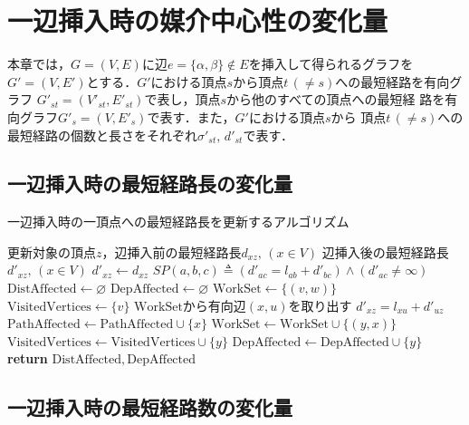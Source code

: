 \chapter{一辺挿入時の媒介中心性の変化量}
\label{chap:update-bc-on-insert}
本章では，$G=(V,E)$に辺$e=\{\alpha,\beta\} \not\in E$を挿入して得られるグラフを
$G'=(V,E')$とする．$G'$における頂点$s$から頂点$t\,(\neq s)$への最短経路を有向グラフ
$G'_{st}=(V'_{st},E'_{st})$で表し，頂点$s$から他のすべての頂点への最短経
路を有向グラフ$G'_s=(V,E'_s)$で表す．また，$G'$における頂点$s$から
頂点$t\,(\neq s)$への最短経路の個数と長さをそれぞれ$\sigma'_{st}$, 
$d'_{st}$で表す．

\section{一辺挿入時の最短経路長の変化量}
\label{sect:update-dist-on-insert}

\begin{algorithm}[H]
  \caption{一辺挿入時の一頂点への最短経路長を更新するアルゴリズム}
  \label{algo:update-dist-on-insert}
  \begin{algorithmic}[1]
    \Require 更新対象の頂点$z$，辺挿入前の最短経路長$d_{xz},\,(x\in V)$
    \Ensure 辺挿入後の最短経路長$d'_{xz},\,(x\in V)$
    \State $d'_{xz}\gets d_{xz}$
    \State $SP(a,b,c)\triangleq(d'_{ac}=l_{ab}+d'_{bc})\land(d'_{ac}\neq\infty)$
    \State $\mathrm{DistAffected}\gets\varnothing$
    \State $\mathrm{DepAffected}\gets\varnothing$
    \State $\mathrm{WorkSet}\gets\{(v,w)\}$
    \State $\mathrm{VisitedVertices}\gets\{v\}$
    \State $\mathrm{WorkSet}$から有向辺$(x,u)$を取り出す
    \State $d'_{xz}=l_{xu}+d'_{uz}$
    \State $\mathrm{PathAffected}\gets\mathrm{PathAffected}\cup\{x\}$
    \State $\mathrm{WorkSet}\gets\mathrm{WorkSet}\cup\{(y,x)\}$
    \State $\mathrm{VisitedVertices}\gets\mathrm{VisitedVertices}\cup\{y\}$
    \EndFor
    \State $\mathrm{DepAffected}\gets\mathrm{DepAffected}\cup\{y\}$
    \EndFor
    \EndIf
    \EndWhile
    \State \textbf{return} $\mathrm{DistAffected},\mathrm{DepAffected}$
    \EndProcedure
  \end{algorithmic}
\end{algorithm}

\section{一辺挿入時の最短経路数の変化量}
\label{sect:update-sigma-on-insert}

